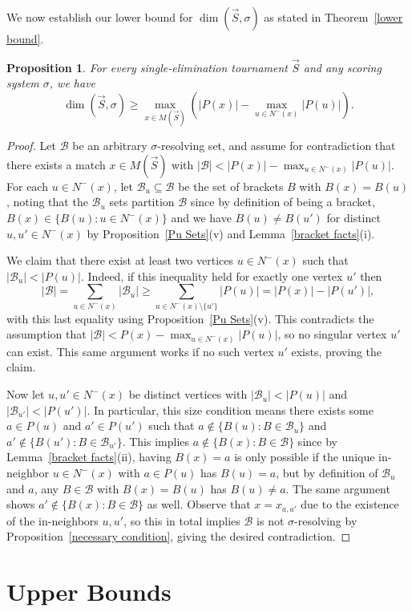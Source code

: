 \documentclass[12pt,letterpaper]{article}
\newtheorem{prop}[thm]{Proposition}
\theoremstyle{definition}
\newcommand{\sig}{\sigma}
\renewcommand{\1}{\mathbbm{1}}
\newcommand{\sm}{\setminus}
\newcommand{\sub}{\subseteq}
\renewcommand{\c}[1]{\mathcal{#1}}
\newcommand{\tour}{\vec{S}}
\begin{document}
We now establish our lower bound for $\dim(\tour,\sig)$ as stated in Theorem~\ref{lower bound}.
\begin{prop}\label{lower bound deterministic}
	For every single-elimination tournament $\tour$ and any scoring system $\sig$, we have
	\[\dim(\tour,\sig)\ge \max_{x\in M(\tour)}\left( |P(x)|-\max_{u\in N^-(x)} |P(u)|\right).\]
\end{prop}
\begin{proof}
	Let $\c{B}$ be an arbitrary $\sig$-resolving set, and assume for contradiction that there exists a match $x\in M(\tour)$ with $|\c{B}|<|P(x)|-\max_{u\in N^-(x)} |P(u)|$.  For each $u\in N^-(x)$, let $\c{B}_u\sub \c{B}$ be the set of brackets $B$ with $B(x)=B(u)$, noting that the $\c{B}_u$ sets partition $\c{B}$ since by definition of being a bracket, $B(x)\in \{B(u):u\in N^-(x)\}$ and we have $B(u)\ne B(u')$ for distinct $u,u'\in N^-(x)$ by Proposition~\ref{Pu Sets}(v) and Lemma~\ref{bracket facts}(i).
	
	We claim that there exist at least two vertices $u\in N^-(x)$ such that $|\c{B}_u|<|P(u)|$.  Indeed, if this inequality held for exactly one vertex $u'$ then
	\[|\c{B}|=\sum_{u\in N^-(x)} |\c{B}_{u}|\ge \sum_{u\in N^-(x)\sm \{u'\}} |P(u)|=|P(x)|-|P(u')|,\]
	with this last equality using Proposition~\ref{Pu Sets}(v).  This contradicts the assumption that $|\c{B}|<P(x)-\max_{u\in N^-(x)} |P(u)|$, so no singular vertex $u'$ can exist.  This same argument works if no such vertex $u'$ exists, proving the claim.
	
	Now let $u,u'\in N^-(x)$ be distinct vertices with $|\c{B}_u|<|P(u)|$ and $|\c{B}_{u'}|<|P(u')|$.  In particular, this size condition means there exists some $a\in P(u)$ and $a'\in P(u')$ such that $a\notin \{B(u):B\in \c{B}_{u}\}$ and $a'\notin \{B(u'):B\in \c{B}_{u'}\}$.  This implies $a\notin \{B(x):B\in \c{B}\}$ since by Lemma~\ref{bracket facts}(ii), having $B(x)=a$ is only possible if the unique in-neighbor $u\in N^-(x)$ with $a\in P(u)$ has $B(u)=a$, but by definition of $\c{B}_u$ and $a$, any $B\in \c{B}$ with $B(x)=B(u)$ has $B(u)\ne a$.  The same argument shows $a'\notin \{B(x):B\in \c{B}\}$ as well. Observe that $x=x_{a,a'}$ due to the existence of the in-neighbors $u,u'$, so this in total implies $\c{B}$ is not $\sig$-resolving by Proposition~\ref{necessary condition}, giving the desired contradiction.
\end{proof}

\section{Upper Bounds}\label{sec:upper}
\end{document}
